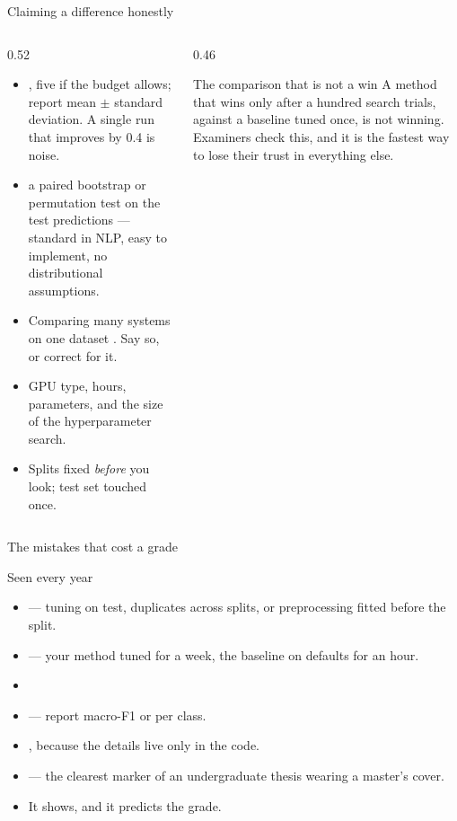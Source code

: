 \documentclass[aspectratio=169,11pt]{beamer}
\begin{document}
\begin{frame}{Claiming a difference honestly}
\begin{columns}[T]
\begin{column}{0.52\textwidth}
\footnotesize
\begin{itemize}
  \item {}, five if the budget allows; report mean
        $\pm$ standard deviation. A single run that improves by 0.4 is noise.
  \item {} a paired bootstrap or permutation test on the test
        predictions --- standard in NLP, easy to implement, no distributional
        assumptions.
  \item Comparing many systems on one dataset .
        Say so, or correct for it.
  \item {} GPU type, hours, parameters, and the size of the
        hyperparameter search.
  \item Splits fixed \emph{before} you look; test set touched once.
\end{itemize}
\end{column}
\begin{column}{0.46\textwidth}
\begin{alertblock}{The comparison that is not a win}
\footnotesize
A method that wins only after a hundred search trials, against a baseline
tuned once, is not winning. Examiners check this, and it is the fastest way to
lose their trust in everything else.
\end{alertblock}
\end{column}
\end{columns}
\end{frame}

\begin{frame}{The mistakes that cost a grade}
\begin{alertblock}{Seen every year}
\begin{itemize}
  \item {} --- tuning on test, duplicates across splits, or
        preprocessing fitted before the split.
  \item {} --- your method tuned for a week, the
        baseline on defaults for an hour.
  \item {}
  \item {} --- report macro-F1 or per class.
  \item {}, because the details
        live only in the code.
  \item {} --- the clearest marker of
        an undergraduate thesis wearing a master's cover.
  \item {} It shows, and it predicts the
        grade.
\end{itemize}
\end{alertblock}
\end{frame}
\end{document}
